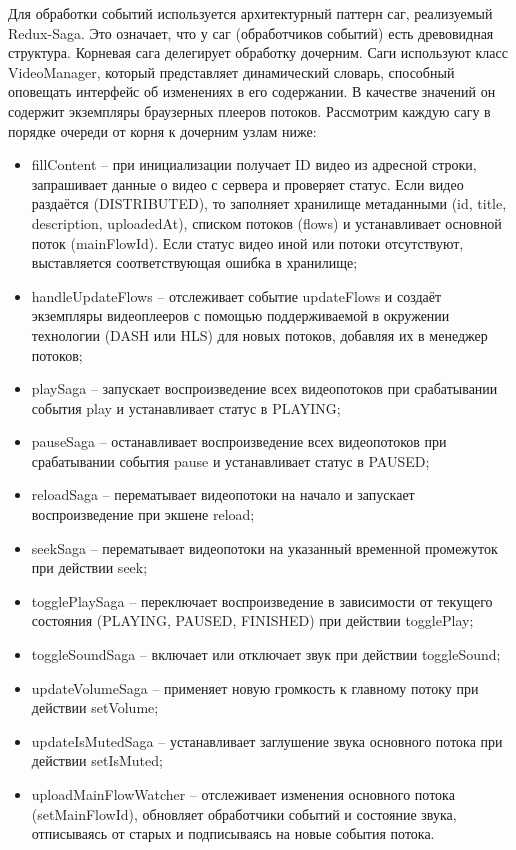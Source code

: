 	Для обработки событий используется архитектурный паттерн саг, реализуемый Redux-Saga. Это означает, что у саг (обработчиков событий) есть древовидная структура. Корневая сага делегирует обработку дочерним. Саги используют класс VideoManager, который представляет динамический словарь, способный оповещать интерфейс об изменениях в его содержании. В качестве значений он содержит экземпляры браузерных плееров потоков. Рассмотрим каждую сагу в порядке очереди от корня к дочерним узлам ниже:
	
	\begin{itemize}[label=$\bullet$]
		\item fillContent – при инициализации получает ID видео из адресной строки, запрашивает данные о видео с сервера и проверяет статус. Если видео раздаётся (DISTRIBUTED), то заполняет хранилище метаданными (id, title, description, uploadedAt), списком потоков (flows) и устанавливает основной поток (mainFlowId). Если статус видео иной или потоки отсутствуют, выставляется соответствующая ошибка в хранилище;
		\item handleUpdateFlows – отслеживает событие updateFlows и создаёт экземпляры видеоплееров с помощью поддерживаемой в окружении технологии (DASH или HLS) для новых потоков, добавляя их в менеджер потоков;
		\item playSaga – запускает воспроизведение всех видеопотоков при срабатывании события play и устанавливает статус в PLAYING;
		\item pauseSaga – останавливает воспроизведение всех видеопотоков при срабатывании события pause и устанавливает статус в PAUSED;
		\item reloadSaga – перематывает видеопотоки на начало и запускает воспроизведение при экшене reload;
		\item seekSaga – перематывает видеопотоки на указанный временной промежуток при действии seek;
		\item togglePlaySaga – переключает воспроизведение в зависимости от текущего состояния (PLAYING, PAUSED, FINISHED) при действии togglePlay;
		\item toggleSoundSaga – включает или отключает звук при действии toggleSound;
		\item updateVolumeSaga – применяет новую громкость к главному потоку при действии setVolume;
		\item updateIsMutedSaga – устанавливает заглушение звука основного потока при действии setIsMuted;
		\item uploadMainFlowWatcher – отслеживает изменения основного потока (setMainFlowId), обновляет обработчики событий и состояние звука, отписываясь от старых и подписываясь на новые события потока.
	\end{itemize}


